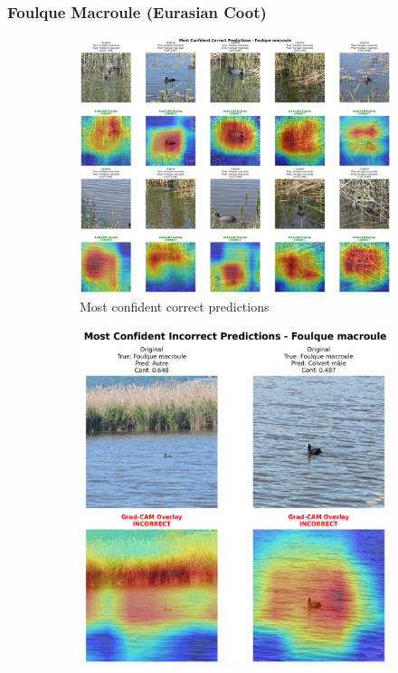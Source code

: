 \documentclass[12pt,a4paper]{article}
\begin{document}
\subsubsection{Foulque Macroule (Eurasian Coot)}

\begin{figure}[H]
    \centering
    \begin{subfigure}[b]{0.45\textwidth}
        \centering
        \includegraphics[width=\textwidth]{../../output/gradcam_best_model_analysis_20250615_172003/class_analysis/Foulque_macroule_correct.png}
        \caption{Most confident correct predictions}
        \label{fig:foulque_correct}
    \end{subfigure}
    \hfill
    \begin{subfigure}[b]{0.45\textwidth}
        \centering
        \includegraphics[width=\textwidth]{../../output/gradcam_best_model_analysis_20250615_172003/class_analysis/Foulque_macroule_incorrect.png}

\end{subfigure}
\end{figure}
\end{document}
